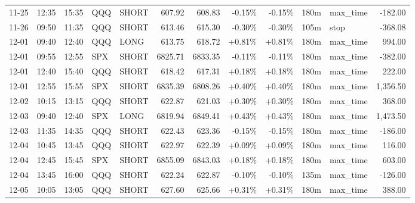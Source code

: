 \documentclass[11pt,a4paper,twoside]{article}
\begin{document}
\begin{center}
\begin{longtable}{>{\color{txtmain}}l l l l l r r r r r >{\color{txtmain}}l r}
11-25 & 12:35 & 15:35 & QQQ & SHORT & 607.92 & 608.83 & \textcolor{lossred}{-0.15\%} & \textcolor{lossred}{-0.15\%} & 180m & max\_time & \textcolor{lossred}{-182.00} \\
11-26 & 09:50 & 11:35 & QQQ & SHORT & 613.46 & 615.30 & \textcolor{lossred}{-0.30\%} & \textcolor{lossred}{-0.30\%} & 105m & stop & \textcolor{lossred}{-368.08} \\
12-01 & 09:40 & 12:40 & QQQ & LONG & 613.75 & 618.72 & \textcolor{wingreen}{+0.81\%} & \textcolor{wingreen}{+0.81\%} & 180m & max\_time & \textcolor{wingreen}{994.00} \\
12-01 & 09:55 & 12:55 & SPX & SHORT & 6825.71 & 6833.35 & \textcolor{lossred}{-0.11\%} & \textcolor{lossred}{-0.11\%} & 180m & max\_time & \textcolor{lossred}{-382.00} \\
12-01 & 12:40 & 15:40 & QQQ & SHORT & 618.42 & 617.31 & \textcolor{wingreen}{+0.18\%} & \textcolor{wingreen}{+0.18\%} & 180m & max\_time & \textcolor{wingreen}{222.00} \\
12-01 & 12:55 & 15:55 & SPX & SHORT & 6835.39 & 6808.26 & \textcolor{wingreen}{+0.40\%} & \textcolor{wingreen}{+0.40\%} & 180m & max\_time & \textcolor{wingreen}{1,356.50} \\
12-02 & 10:15 & 13:15 & QQQ & SHORT & 622.87 & 621.03 & \textcolor{wingreen}{+0.30\%} & \textcolor{wingreen}{+0.30\%} & 180m & max\_time & \textcolor{wingreen}{368.00} \\
12-03 & 09:40 & 12:40 & SPX & LONG & 6819.94 & 6849.41 & \textcolor{wingreen}{+0.43\%} & \textcolor{wingreen}{+0.43\%} & 180m & max\_time & \textcolor{wingreen}{1,473.50} \\
12-03 & 11:35 & 14:35 & QQQ & SHORT & 622.43 & 623.36 & \textcolor{lossred}{-0.15\%} & \textcolor{lossred}{-0.15\%} & 180m & max\_time & \textcolor{lossred}{-186.00} \\
12-04 & 10:45 & 13:45 & QQQ & SHORT & 622.97 & 622.39 & \textcolor{wingreen}{+0.09\%} & \textcolor{wingreen}{+0.09\%} & 180m & max\_time & \textcolor{wingreen}{116.00} \\
12-04 & 12:45 & 15:45 & SPX & SHORT & 6855.09 & 6843.03 & \textcolor{wingreen}{+0.18\%} & \textcolor{wingreen}{+0.18\%} & 180m & max\_time & \textcolor{wingreen}{603.00} \\
12-04 & 13:45 & 16:00 & QQQ & SHORT & 622.24 & 622.87 & \textcolor{lossred}{-0.10\%} & \textcolor{lossred}{-0.10\%} & 135m & max\_time & \textcolor{lossred}{-126.00} \\
12-05 & 10:05 & 13:05 & QQQ & SHORT & 627.60 & 625.66 & \textcolor{wingreen}{+0.31\%} & \textcolor{wingreen}{+0.31\%} & 180m & max\_time & \textcolor{wingreen}{388.00} \\

\end{longtable}
\end{center}
\end{document}
